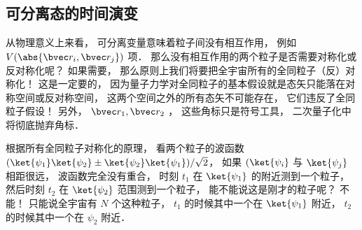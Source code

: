 \subsection{可分离态的时间演变}
从物理意义上来看， 可分离变量意味着粒子间没有相互作用， 例如 $V(\abs{\bvec r_i, \bvec r_j})$ 项． 那么没有相互作用的两个粒子是否需要对称化或反对称化呢？ 如果需要， 那么原则上我们将要把全宇宙所有的全同粒子（反）对称化！ 这是一定要的， 因为量子力学对全同粒子的基本假设就是态矢只能落在对称空间或反对称空间， 这两个空间之外的所有态矢不可能存在， 它们违反了全同粒子假设！ 另外， $\bvec r_1, \bvec r_2$ ， 这些角标只是符号工具， 二次量子化中将彻底抛弃角标．

根据所有全同粒子对称化的原理， 看两个粒子的波函数 $(\ket{\psi_1}\ket{\psi_2} \pm \ket{\psi_2}\ket{\psi_1})/\sqrt{2}$， 如果 $(\ket{\psi_i}$ 与 $\ket{\psi_j}$ 相距很远， 波函数完全没有重合， 时刻 $t_1$ 在 $\ket{\psi_1}$ 的附近测到一个粒子， 然后时刻 $t_2$ 在 $\ket{\psi_2}$ 范围测到一个粒子， 能不能说这是刚才的粒子呢？ 不能！ 只能说全宇宙有 $N$ 个这种粒子， $t_1$ 的时候其中一个在 $\ket{\psi_1}$ 附近， $t_2$ 的时候其中一个在 $\psi_2$ 附近．
